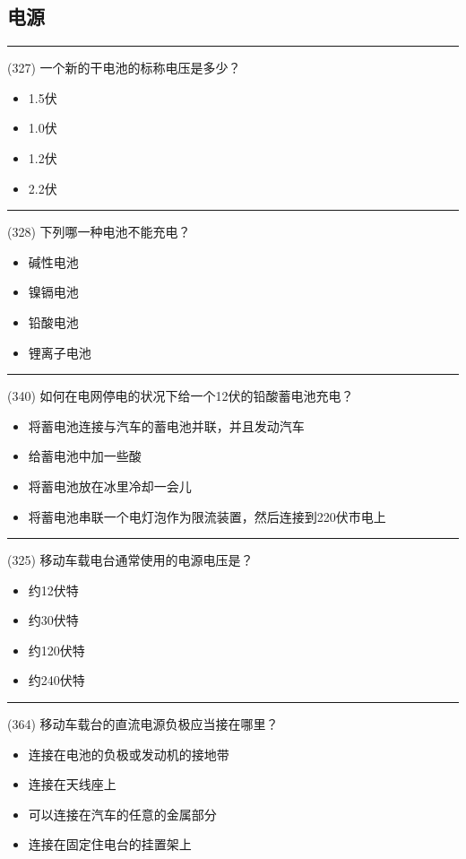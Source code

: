 \documentclass[twocolumn,hyperref,UTF8]{ctexart}  %
\begin{document}
\subsection{电源}


\noindent\rule{0.5\textwidth}{1pt}
\heiti (327) 一个新的干电池的标称电压是多少？ \songti {\color{gray} [LK1153] }
\begin{itemize}
	\item  1.5伏
	\item  1.0伏
	\item  1.2伏
	\item  2.2伏
\end{itemize}


\noindent\rule{0.5\textwidth}{1pt}
\heiti (328) 下列哪一种电池不能充电？ \songti {\color{gray} [LK1154] }
\begin{itemize}
	\item  碱性电池
	\item  镍镉电池
	\item  铅酸电池
	\item  锂离子电池
\end{itemize}


\noindent\rule{0.5\textwidth}{1pt}
\heiti (340) 如何在电网停电的状况下给一个12伏的铅酸蓄电池充电？ \songti {\color{gray} [LK1229] }
\begin{itemize}
	\item  将蓄电池连接与汽车的蓄电池并联，并且发动汽车
	\item  给蓄电池中加一些酸
	\item  将蓄电池放在冰里冷却一会儿
	\item  将蓄电池串联一个电灯泡作为限流装置，然后连接到220伏市电上
\end{itemize}


\noindent\rule{0.5\textwidth}{1pt}
\heiti (325) 移动车载电台通常使用的电源电压是？ \songti {\color{gray} [LK1137] }
\begin{itemize}
	\item  约12伏特
	\item  约30伏特
	\item  约120伏特
	\item  约240伏特
\end{itemize}


\noindent\rule{0.5\textwidth}{1pt}
\heiti (364) 移动车载台的直流电源负极应当接在哪里？ \songti {\color{gray} [LK1128] }
\begin{itemize}
	\item  连接在电池的负极或发动机的接地带
	\item  连接在天线座上
	\item  可以连接在汽车的任意的金属部分
	\item  连接在固定住电台的挂置架上
\end{itemize}
\end{document}
